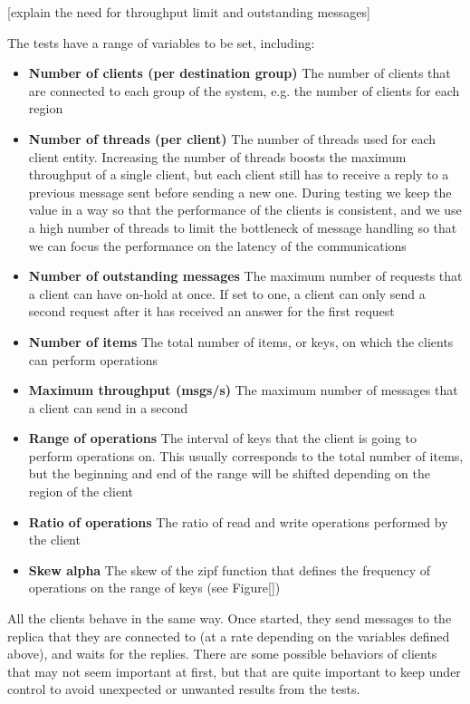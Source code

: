 [explain the need for throughput limit and outstanding messages]

The tests have a range of variables to be set, including:
\begin{itemize}
  \item \textbf{Number of clients (per destination group)} The number of clients that are connected to each group of the system, e.g. the number of clients for each region
  \item \textbf{Number of threads (per client)} The number of threads used for each client entity. Increasing the number of threads boosts the maximum throughput of a single client, but each client still has to receive a reply to a previous message sent before sending a new one. During testing we keep the value in a way so that the performance of the clients is consistent, and we use a high number of threads to limit the bottleneck of message handling so that we can focus the performance on the latency of the communications
  \item \textbf{Number of outstanding messages} The maximum number of requests that a client can have on-hold at once. If set to one, a client can only send a second request after it has received an answer for the first request
  \item \textbf{Number of items} The total number of items, or keys, on which the clients can perform operations
  \item \textbf{Maximum throughput (msgs/s)} The maximum number of messages that a client can send in a second
  \item \textbf{Range of operations} The interval of keys that the client is going to perform operations on. This usually corresponds to the total number of items, but the beginning and end of the range will be shifted depending on the region of the client
  \item \textbf{Ratio of operations} The ratio of read and write operations performed by the client
  \item \textbf{Skew alpha} The skew of the zipf function that defines the frequency of operations on the range of keys (see Figure[])
\end{itemize}

All the clients behave in the same way. Once started, they send messages to the replica that they are connected to (at a rate depending on the variables defined above), and waits for the replies. There are some possible behaviors of clients that may not seem important at first, but that are quite important to keep under control to avoid unexpected or unwanted results from the tests.

